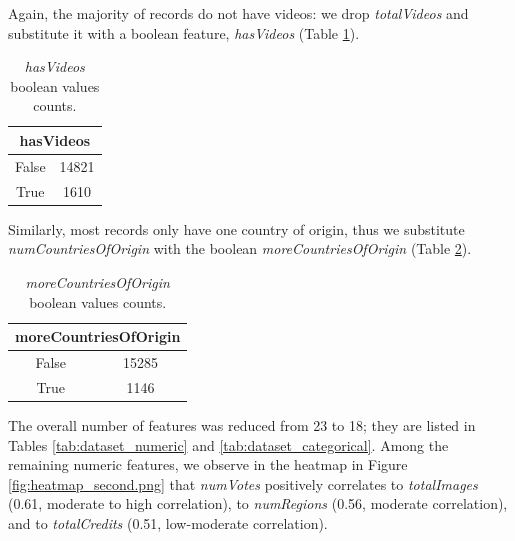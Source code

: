 Again, the majority of records do not have videos: we drop \textit{totalVideos} and substitute it with a boolean feature, \textit{hasVideos} (Table \ref{tab:hasVideos_bool}).
\begin{table}[h]
    \centering
    \renewcommand{\arraystretch}{1}
    \begin{tabular}{|c|c|}
        \hline
        \multicolumn{2}{|c|}{\textbf{hasVideos}} \\ \hline
        False & 14821 \\ \hline
        True  & 1610 \\ \hline
    \end{tabular}
    \caption{\textit{hasVideos} boolean values counts.}
    \label{tab:hasVideos_bool}
\end{table}

Similarly, most records only have one country of origin, thus we substitute \textit{numCountriesOfOrigin} with the boolean \textit{moreCountriesOfOrigin} (Table \ref{tab:moreCountriesOfOrigins_bool}).
\begin{table}[h]
    \centering
    \renewcommand{\arraystretch}{1}
    \begin{tabular}{|c|c|}
        \hline
        \multicolumn{2}{|c|}{\textbf{moreCountriesOfOrigin}} \\ \hline
        False & 15285 \\ \hline
        True  & 1146 \\ \hline
    \end{tabular}
    \caption{\textit{moreCountriesOfOrigin} boolean values counts.}
    \label{tab:moreCountriesOfOrigins_bool}
\end{table}

The overall number of features was reduced from 23 to 18; they are listed in Tables \ref{tab:dataset_numeric} and \ref{tab:dataset_categorical}. Among the remaining numeric features, we observe in the heatmap in Figure \ref{fig:heatmap_second.png} that \textit{numVotes} positively correlates to \textit{totalImages} (0.61, moderate to high correlation), to \textit{numRegions} (0.56, moderate correlation), and to \textit{totalCredits} (0.51, low-moderate correlation). 

